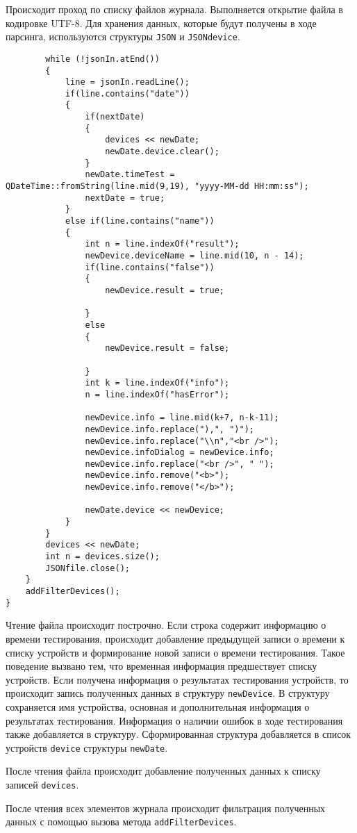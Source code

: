 Происходит проход по списку файлов журнала. Выполняется открытие файла в кодировке UTF-8. Для хранения данных, которые
будут получены в ходе парсинга, используются структуры \texttt{JSON} и \texttt{JSONdevice}.
\medskip
\begin{verbatim}
		while (!jsonIn.atEnd())
		{
			line = jsonIn.readLine();
			if(line.contains("date"))
			{
				if(nextDate)
				{
					devices << newDate;
					newDate.device.clear();
				}
				newDate.timeTest = QDateTime::fromString(line.mid(9,19), "yyyy-MM-dd HH:mm:ss");
				nextDate = true;
			}
			else if(line.contains("name"))
			{
				int n = line.indexOf("result");
				newDevice.deviceName = line.mid(10, n - 14);
				if(line.contains("false"))
				{
					newDevice.result = true;

				}
				else
				{
					newDevice.result = false;

				}
				int k = line.indexOf("info");
				n = line.indexOf("hasError");

				newDevice.info = line.mid(k+7, n-k-11);
				newDevice.info.replace("),", ")");
				newDevice.info.replace("\\n","<br />");
				newDevice.infoDialog = newDevice.info;
				newDevice.info.replace("<br />", " ");
				newDevice.info.remove("<b>");
				newDevice.info.remove("</b>");

				newDate.device << newDevice;
			}
		}
		devices << newDate;
		int n = devices.size();
		JSONfile.close();
	}
	addFilterDevices();
}
\end{verbatim}
\medskip

Чтение файла происходит построчно.
Если строка содержит информацию о времени тестирования, происходит добавление предыдущей
записи о времени к списку устройств и формирование новой записи о времени тестирования. Такое поведение вызвано тем, что
временная информация предшествует списку устройств. Если получена информация о результатах тестирования устройств, то
происходит запись полученных данных в структуру \texttt{newDevice}. В структуру сохраняется имя устройства, основная и
дополнительная информация о результатах тестирования. Информация о наличии ошибок в ходе тестирования также добавляется
в структуру. Сформированная структура добавляется в список устройств \texttt{device} структуры \texttt{newDate}.

После чтения файла происходит добавление полученных данных к списку записей \texttt{devices}.

После чтения всех элементов журнала происходит фильтрация полученных данных с помощью вызова метода
\texttt{addFilterDevices}.


